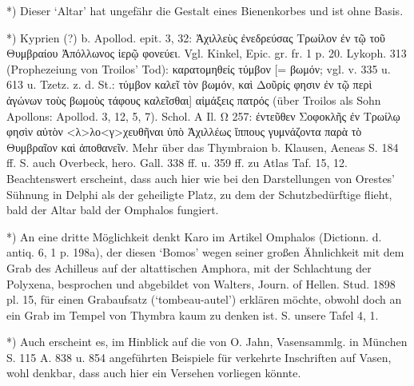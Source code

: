 \documentclass[a4paper, 11pt, oneside]{article}
\begin{document}
*) Dieser `Altar' hat ungefähr die Gestalt eines Bienenkorbes und ist ohne Basis.

*) Kyprien (?) b. Apollod. epit. 3, 32: Ἀχιλλεὺς ἐνεδρεύσας Τρωίλον ἐν τῷ τοῦ Θυμβραίου Ἀπόλλωνος ἱερῷ φονεύει. Vgl. Kinkel, Epic. gr. fr. 1 p. 20. Lykoph. 313 (Prophezeiung von Troilos' Tod): καρατομηθείς τύμβον [= βωμόν; vgl. v. 335 u. 613 u. Tzetz. z. d. St.: τύμβον καλεῖ τὸν βωμόν, καὶ Δοῦρίς φησιν ἐν τῷ περὶ ἀγώνων τοὺς βωμοὺς τάφους καλεῖσθαι] αἰμάξεις πατρός (über Troilos als Sohn Apollons: Apollod. 3, 12, 5, 7). Schol. A Il. Ω 257: ἐντεῦθεν Σοφοκλῆς ἐν Τρωίλῳ φησὶν αὐτὸν <λ>λο<γ>χευθῆναι ὑπὸ Ἀχιλλέως ἵππους γυμνάζοντα παρὰ τὸ Θυμβραῖον καὶ ἀποθανεῖν. Mehr über das Thymbraion b. Klausen, Aeneas S. 184 ff. S. auch Overbeck, hero. Gall. 338 ff. u. 359 ff. zu Atlas Taf. 15, 12. Beachtenswert erscheint, dass auch hier wie bei den Darstellungen von Orestes' Sühnung in Delphi als der geheiligte Platz, zu dem der Schutzbedürftige flieht, bald der Altar bald der Omphalos fungiert.

*) An eine dritte Möglichkeit denkt Karo im Artikel Omphalos (Dictionn. d. antiq. 6, 1 p. 198a), der diesen `Bomos' wegen seiner großen Ähnlichkeit mit dem Grab des Achilleus auf der altattischen Amphora, mit der Schlachtung der Polyxena, besprochen und abgebildet von Walters, Journ. of Hellen. Stud. 1898 pl. 15, für einen Grabaufsatz (`tombeau-autel') erklären möchte, obwohl doch an ein Grab im Tempel von Thymbra kaum zu denken ist. S. unsere Tafel 4, 1.

*) Auch erscheint es, im Hinblick auf die von O. Jahn, Vasensammlg. in München S. 115 A. 838 u. 854 angeführten Beispiele für verkehrte Inschriften auf Vasen, wohl denkbar, dass auch hier ein Versehen vorliegen könnte.
\end{document}
